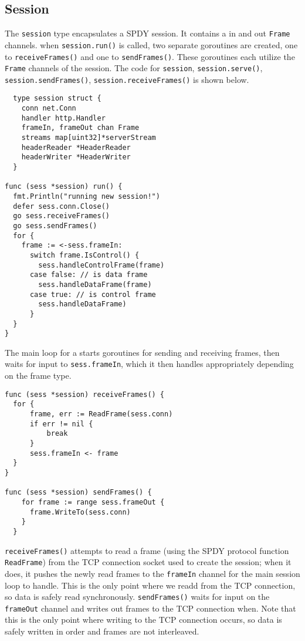 \documentclass{article}
\begin{document}
\subsection{Session}
The \verb|session| type encapsulates a SPDY session. It contains a in and out \verb|Frame| channels. when \verb|session.run()| is called, two separate goroutines are created, one to \verb|receiveFrames()| and one to \verb|sendFrames()|. These goroutines each utilize the \verb|Frame| channels of the session. 
The code for \verb|session|, \verb|session.serve()|, \verb|session.sendFrames()|, \verb|session.receiveFrames()| is shown below.
\begin{verbatim}
  type session struct {
    conn net.Conn
    handler http.Handler
    frameIn, frameOut chan Frame
    streams map[uint32]*serverStream
    headerReader *HeaderReader
    headerWriter *HeaderWriter
  }

func (sess *session) run() {
  fmt.Println("running new session!")
  defer sess.conn.Close()
  go sess.receiveFrames()
  go sess.sendFrames()
  for {
    frame := <-sess.frameIn:
      switch frame.IsControl() {
        sess.handleControlFrame(frame)
      case false: // is data frame
        sess.handleDataFrame(frame)
      case true: // is control frame
        sess.handleDataFrame)
      }
  }
}
\end{verbatim}
The main loop for a starts goroutines for sending and receiving frames, then waits for input to \verb|sess.frameIn|, which it then handles appropriately depending on the frame type.

\begin{verbatim}
func (sess *session) receiveFrames() {
  for {
      frame, err := ReadFrame(sess.conn)
      if err != nil {
          break
      }
      sess.frameIn <- frame
  }
}

func (sess *session) sendFrames() {
    for frame := range sess.frameOut {
      frame.WriteTo(sess.conn)
    }
  }
\end{verbatim}

\verb|receiveFrames()| attempts to read a frame (using the SPDY protocol function \verb|ReadFrame|) from the TCP connection socket used to create the session; when it does, it pushes the newly read frames to the \verb|frameIn| channel for the main session loop to handle. This is the only point where we readd from the TCP connection, so data is safely read synchronously.  \verb|sendFrames()| waits for input on the \verb|frameOut| channel and writes out frames to the TCP connection when. Note that this is the only point where writing to the TCP connection occurs, so data is safely written in order and frames are not interleaved.
\end{document}
